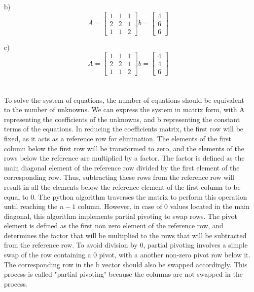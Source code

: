 \documentclass{article}
\begin{document}
       b)$$
        A =  \begin{bmatrix}1&1&1\\2&2&1\\1&1&2\end{bmatrix} 
b =   \begin{bmatrix}4\\6\\6\end{bmatrix} 
        $$
        
      c)  $$
        A =  \begin{bmatrix}1&1&1\\2&2&1\\1&1&2\end{bmatrix} 
b =   \begin{bmatrix}4\\4\\6\end{bmatrix} 
        $$
       \\
       \\
        To solve the system of equations, the number of equations should be equivalent to the number of unknowns. We can express the system in matrix form, with A representing the coefficients of the unknowns, and b representing the constant terms of the equations. In reducing the coefficients matrix, the first row will be fixed, as it acts as a reference row for elimination. The elements of the first column below the first row will be transformed to zero, and the elements of the rows below the reference are multiplied by a factor. The factor is defined as the main diagonal element of the reference row divided by the first element of the corresponding row. Thus, subtracting these rows from the reference row will result in all the elements below the reference element of the first column to be equal to 0. The python algorithm traverses the matrix to perform this operation until reaching the $n - 1$ column. 
        However, in case of 0 values located in the main diagonal, this algorithm implements partial pivoting to swap rows. The pivot element is defined as the first non zero element of the reference row, and determines the factor that will be multiplied to the rows that will be subtracted from the reference row. To avoid division by 0, partial pivoting involves a simple swap of the row containing a 0 pivot, with a another non-zero pivot row below it. The corresponding row in the b vector should also be swapped accordingly. This process is called "partial pivoting" because the columns are not swapped in the process.
    
\end{document}
